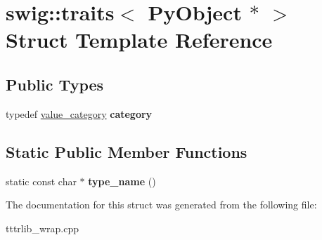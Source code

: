 \hypertarget{structswig_1_1traits_3_01_py_object_01_5_01_4}{}\section{swig\+:\+:traits$<$ Py\+Object $\ast$ $>$ Struct Template Reference}
\label{structswig_1_1traits_3_01_py_object_01_5_01_4}
\subsection*{Public Types}
\begin{DoxyCompactItemize}
\item 
\mbox{\label{structswig_1_1traits_3_01_py_object_01_5_01_4_a61e2b13476996b055b368fe035b84efc}} 
typedef \hyperlink{structswig_1_1value__category}{value\+\_\+category} {\bfseries category}
\end{DoxyCompactItemize}
\subsection*{Static Public Member Functions}
\begin{DoxyCompactItemize}
\item 
\mbox{\label{structswig_1_1traits_3_01_py_object_01_5_01_4_a0d02bab40318920cce95270a10e465cd}} 
static const char $\ast$ {\bfseries type\+\_\+name} ()
\end{DoxyCompactItemize}


The documentation for this struct was generated from the following file\+:\begin{DoxyCompactItemize}
\item 
tttrlib\+\_\+wrap.\+cpp\end{DoxyCompactItemize}
